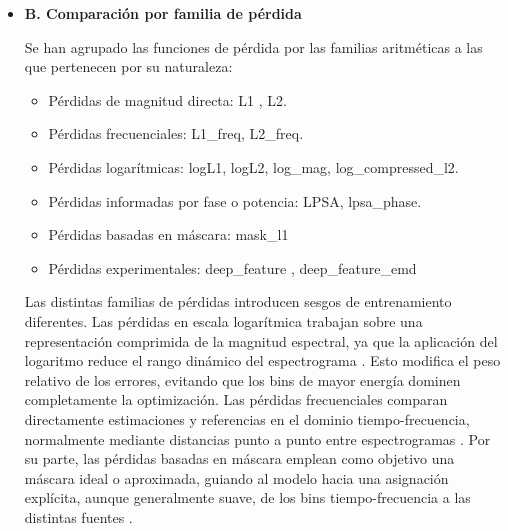 \begin{itemize}
    \item \textbf{B. Comparación por familia de pérdida}

Se han agrupado las funciones de pérdida por las familias aritméticas a las que pertenecen por su naturaleza:

    \begin{itemize}
        \item Pérdidas de magnitud directa: L1 , L2.
        \item Pérdidas frecuenciales: L1\_freq, L2\_freq.
        \item Pérdidas logarítmicas: logL1, logL2, log\_mag, log\_compressed\_l2.
        \item Pérdidas informadas por fase o potencia: LPSA, lpsa\_phase.
        \item Pérdidas basadas en máscara: mask\_l1
        \item Pérdidas experimentales: deep\_feature , deep\_feature\_emd
    \end{itemize}

Las distintas familias de pérdidas introducen sesgos de entrenamiento diferentes.
Las pérdidas en escala logarítmica trabajan sobre una representación comprimida de la magnitud espectral, ya que la aplicación del logaritmo reduce el rango dinámico del espectrograma \cite{yang2021dprtf}. Esto modifica el peso relativo de los errores, evitando que los bins de mayor energía dominen completamente la optimización.
Las pérdidas frecuenciales comparan directamente estimaciones y referencias en el dominio tiempo-frecuencia, normalmente mediante distancias punto a punto entre espectrogramas \cite{sahai2019spectrogram}. 
Por su parte, las pérdidas basadas en máscara emplean como objetivo una máscara ideal o aproximada, guiando al modelo hacia una asignación explícita, aunque generalmente suave, de los bins tiempo-frecuencia a las distintas fuentes \cite{xia2017optimalratio,wang2008tfmasking}.

\end{itemize}